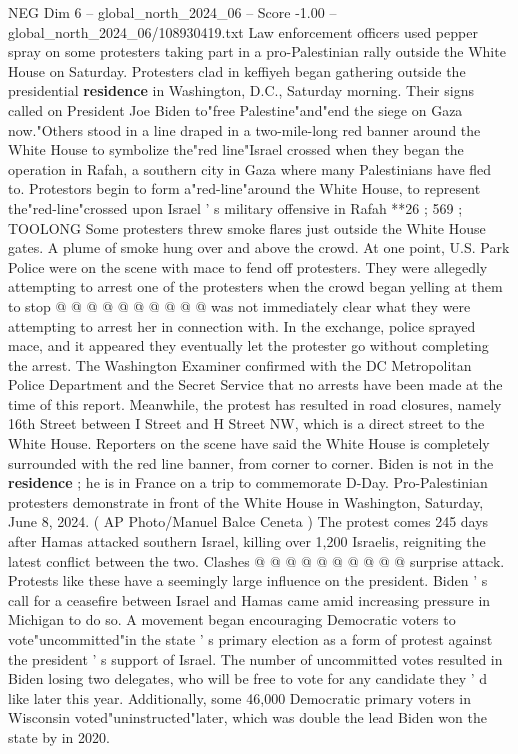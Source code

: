 \begin{textsample}{NEG Dim 6 – global\_north\_2024\_06 – Score -1.00 – global\_north\_2024\_06/108930419.txt}  \label{ex:f6_neg_312}
Law enforcement officers used pepper spray on some protesters taking part in a pro-Palestinian rally outside the White House on Saturday.
Protesters clad in keffiyeh began gathering outside the presidential \textbf{residence} in Washington, D.C., Saturday morning.
Their signs called on President Joe Biden to"free Palestine"and"end the siege on Gaza now."Others stood in a line draped in a two-mile-long red banner around the White House to symbolize the"red line"Israel crossed when they began the operation in Rafah, a southern city in Gaza where many Palestinians have fled to.
Protestors begin to form a"red-line"around the White House, to represent the"red-line"crossed upon Israel ' s military offensive in Rafah **26 ; 569 ; TOOLONG Some protesters threw smoke flares just outside the White House gates.
A plume of smoke hung over and above the crowd.
At one point, U.S.
Park Police were on the scene with mace to fend off protesters.
They were allegedly attempting to arrest one of the protesters when the crowd began yelling at them to stop @ @ @ @ @ @ @ @ @ @ was not immediately clear what they were attempting to arrest her in connection with.
In the exchange, police sprayed mace, and it appeared they eventually let the protester go without completing the arrest.
The Washington Examiner confirmed with the DC Metropolitan Police Department and the Secret Service that no arrests have been made at the time of this report.
Meanwhile, the protest has resulted in road closures, namely 16th Street between I Street and H Street NW, which is a direct street to the White House.
Reporters on the scene have said the White House is completely surrounded with the red line banner, from corner to corner.
Biden is not in the \textbf{residence} ; he is in France on a trip to commemorate D-Day.
Pro-Palestinian protesters demonstrate in front of the White House in Washington, Saturday, June 8, 2024. ( AP Photo/Manuel Balce Ceneta ) The protest comes 245 days after Hamas attacked southern Israel, killing over 1,200 Israelis, reigniting the latest conflict between the two.
Clashes @ @ @ @ @ @ @ @ @ @ surprise attack.
Protests like these have a seemingly large influence on the president.
Biden ' s call for a ceasefire between Israel and Hamas came amid increasing pressure in Michigan to do so.
A movement began encouraging Democratic voters to vote"uncommitted"in the state ' s primary election as a form of protest against the president ' s support of Israel.
The number of uncommitted votes resulted in Biden losing two delegates, who will be free to vote for any candidate they ' d like later this year.
Additionally, some 46,000 Democratic primary voters in Wisconsin voted"uninstructed"later, which was double the lead Biden won the state by in 2020.

\end{textsample}
